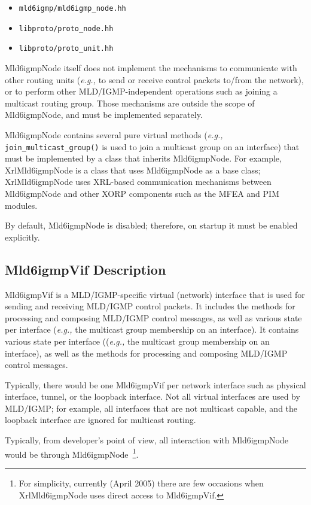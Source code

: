 \documentclass[11pt]{article}
\newcommand{\eg}{\emph{e.g.,}\xspace}
\begin{document}
\begin{itemize}
  \item \verb=mld6igmp/mld6igmp_node.hh=
  \item \verb=libproto/proto_node.hh=
  \item \verb=libproto/proto_unit.hh=
\end{itemize}

Mld6igmpNode itself does not implement the mechanisms to communicate with
other routing units (\eg to send or receive control packets to/from the
network), or to perform other MLD/IGMP-independent operations such as
joining a multicast routing group. Those mechanisms are outside the scope of
Mld6igmpNode, and must be implemented separately.

Mld6igmpNode contains several pure virtual methods (\eg
\verb=join_multicast_group()= is used to join a multicast group on
an interface) that must be implemented by a class that inherits Mld6igmpNode.
For example, XrlMld6igmpNode is a class that uses Mld6igmpNode as a base
class; XrlMld6igmpNode uses XRL-based communication mechanisms between
Mld6igmpNode and other XORP components such as the MFEA and PIM modules.

By default, Mld6igmpNode is disabled; therefore, on startup it must be
enabled explicitly.

\subsection{Mld6igmpVif Description}

Mld6igmpVif is a MLD/IGMP-specific virtual (network) interface that is
used for sending and receiving MLD/IGMP control packets. It includes the
methods for processing and composing MLD/IGMP control messages, as well
as various state per interface (\eg the multicast group membership on an
interface). It contains various state per interface ((\eg the multicast
group membership on an interface), as well as the methods for processing
and composing MLD/IGMP control messages.

Typically, there would be one Mld6igmpVif per network interface
such as physical interface, tunnel, or the loopback
interface. Not all virtual interfaces are
used by MLD/IGMP; for example, all interfaces that are not multicast
capable, and the loopback interface are ignored for multicast
routing.

Typically, from developer's point of view, all interaction with Mld6igmpNode
would be through Mld6igmpNode~\footnote{For simplicity, currently
(April 2005) there are few occasions when XrlMld6igmpNode uses
direct access to Mld6igmpVif.}.
\end{document}
